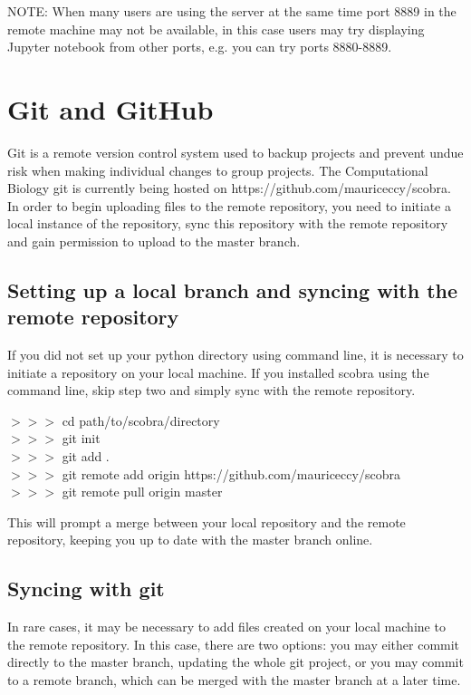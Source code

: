 NOTE: When many users are using the server at the same time port 8889 in the remote machine may not be available, in this case users may try displaying Jupyter notebook from other ports, e.g. you can try ports 8880-8889.


\section{Git and GitHub}
Git is a remote version control system used to backup projects and prevent undue risk when making individual changes to group projects. The Computational Biology git is currently being hosted on https://github.com/mauriceccy/scobra. In order to begin uploading files to the remote repository, you need to initiate a local instance of the repository, sync this repository with the remote repository and gain permission to upload to the master branch.

\subsection{Setting up a local branch and syncing with the remote repository}

If you did not set up your python directory using command line, it is necessary to initiate a repository on your local machine. If you installed scobra using the command line, skip step two and simply sync with the remote repository.

\begin{mdframed}
$>>>$ \quad cd path/to/scobra/directory\\
$>>>$ \quad git init\\
$>>>$ \quad git add .\\
$>>>$ \quad git remote add origin https://github.com/mauriceccy/scobra\\
$>>>$ \quad git remote pull origin master
\end{mdframed}

This will prompt a merge between your local repository and the remote repository, keeping you up to date with the master branch online.

\subsection{Syncing with git}

In rare cases, it may be necessary to add files created on your local machine to the remote repository. In this case, there are two options: you may either commit directly to the master branch, updating the whole git project, or you may commit to a remote branch, which can be merged with the master branch at a later time.\\

